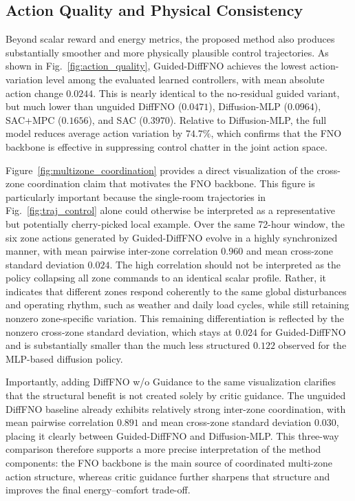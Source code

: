 \subsection{Action Quality and Physical Consistency}

Beyond scalar reward and energy metrics, the proposed method also produces substantially smoother and more physically plausible control trajectories. As shown in Fig.~\ref{fig:action_quality}, Guided-DiffFNO achieves the lowest action-variation level among the evaluated learned controllers, with mean absolute action change $0.0244$. This is nearly identical to the no-residual guided variant, but much lower than unguided DiffFNO ($0.0471$), Diffusion-MLP ($0.0964$), SAC+MPC ($0.1656$), and SAC ($0.3970$). Relative to Diffusion-MLP, the full model reduces average action variation by $74.7\%$, which confirms that the FNO backbone is effective in suppressing control chatter in the joint action space.

Figure~\ref{fig:multizone_coordination} provides a direct visualization of the cross-zone coordination claim that motivates the FNO backbone. This figure is particularly important because the single-room trajectories in Fig.~\ref{fig:traj_control} alone could otherwise be interpreted as a representative but potentially cherry-picked local example. Over the same 72-hour window, the six zone actions generated by Guided-DiffFNO evolve in a highly synchronized manner, with mean pairwise inter-zone correlation $0.960$ and mean cross-zone standard deviation $0.024$. The high correlation should not be interpreted as the policy collapsing all zone commands to an identical scalar profile. Rather, it indicates that different zones respond coherently to the same global disturbances and operating rhythm, such as weather and daily load cycles, while still retaining nonzero zone-specific variation. This remaining differentiation is reflected by the nonzero cross-zone standard deviation, which stays at $0.024$ for Guided-DiffFNO and is substantially smaller than the much less structured $0.122$ observed for the MLP-based diffusion policy.

Importantly, adding DiffFNO w/o Guidance to the same visualization clarifies that the structural benefit is not created solely by critic guidance. The unguided DiffFNO baseline already exhibits relatively strong inter-zone coordination, with mean pairwise correlation $0.891$ and mean cross-zone standard deviation $0.030$, placing it clearly between Guided-DiffFNO and Diffusion-MLP. This three-way comparison therefore supports a more precise interpretation of the method components: the FNO backbone is the main source of coordinated multi-zone action structure, whereas critic guidance further sharpens that structure and improves the final energy--comfort trade-off.

